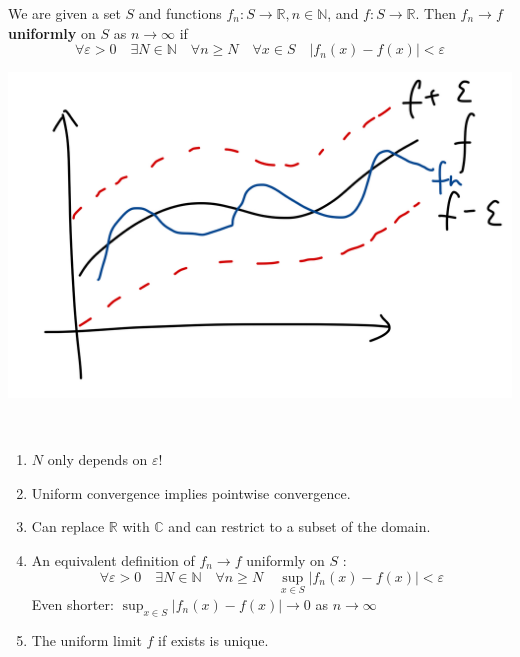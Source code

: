 \documentclass[a4paper,11pt]{article}
\renewcommand{\epsilon}{\varepsilon}
\begin{document}
\begin{definition}
    We are given a set $S$ and functions $f_{n}: S \rightarrow \mathbb{R}, n \in \mathbb{N}$, and $f: S \rightarrow \mathbb{R}$. Then $f_{n} \rightarrow f$ \textbf{uniformly} on $S$ as $n \rightarrow \infty$ if
    \[
    \forall \varepsilon>0 \quad \exists N \in \mathbb{N} \quad \forall n \geqslant N \quad \forall x \in S \quad\left|f_{n}(x)-f(x)\right|<\varepsilon
    \]
    \begin{center}
        \includegraphics[scale=0.11]{at1.jpeg}
    \end{center}
\end{definition}

\begin{remark}\
    \begin{enumerate}
        \item $ N $ only depends on $\epsilon$!
        \item Uniform convergence implies pointwise convergence.
        \item Can replace $\mathbb{R}$ with $\mathbb{C}$ and can restrict to a subset of the domain.
        \item An equivalent definition of $f_{n} \rightarrow f$ uniformly on $S$ :
        \[
        \forall \varepsilon>0 \quad \exists N \in \mathbb{N} \quad \forall n \geqslant N \quad \sup _{x \in S}\left|f_{n}(x)-f(x)\right|<\varepsilon
        \]
        Even shorter: $\sup _{x \in S}\left|f_{n}(x)-f(x)\right| \rightarrow 0$ as $n \rightarrow \infty$
        \item The uniform limit $f$ if exists is unique.
    \end{enumerate}
\end{remark}
\end{document}
